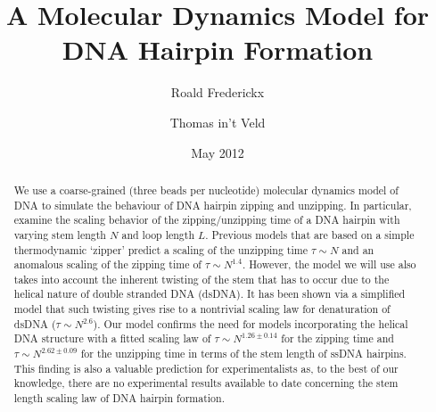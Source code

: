 \documentclass[a4paper, 11pt]{article}
\title{A Molecular Dynamics Model for DNA Hairpin Formation}
\author{Roald Frederickx \and Thomas in't Veld}
\date{May 2012}
\begin{document}
\maketitle

\begin{abstract}
We use a coarse-grained (three beads per nucleotide) molecular dynamics model of DNA to simulate the behaviour of DNA hairpin zipping and unzipping. In particular, examine the scaling behavior of the zipping/unzipping time of a DNA hairpin with varying stem length $N$ and loop length $L$. Previous models that are based on a simple thermodynamic `zipper' predict a scaling of the unzipping time $\tau \sim N$ and an anomalous scaling of the zipping time of $\tau \sim N^{1.4}$. However, the model we will use also takes into account the inherent twisting of the stem that has to occur due to the helical nature of double stranded DNA (dsDNA). It has been shown via a simplified model that such twisting gives rise to a nontrivial scaling law for denaturation of dsDNA ($\tau \sim N^{2.6}$). Our model confirms the need for models incorporating the helical DNA structure with a fitted scaling law of $\tau \sim N^{1.26\pm0.14}$ for the zipping time and $\tau \sim N^{2.62\pm0.09}$ for the unzipping time in terms of the stem length of ssDNA hairpins. This finding is also a valuable prediction for experimentalists as, to the best of our knowledge, there are no experimental results available to date concerning the stem length scaling law of DNA hairpin formation.
\end{abstract}
\newpage
\tableofcontents








\footnotesize

	
\end{document}
